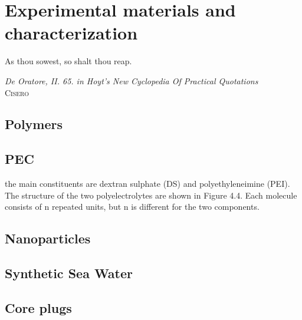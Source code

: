 \chapter{Experimental materials and characterization}
\vspace*{\fill}
\epigraph{As thou sowest, so shalt thou reap.}%
{\textit{De Oratore, II. 65. in Hoyt's New Cyclopedia Of Practical Quotations}\\ \textsc{Cisero}}
\clearpage{\thispagestyle{empty}\cleardoublepage}
\section{Polymers}

\section{PEC}
the main constituents are dextran sulphate (DS) and polyethyleneimine (PEI). The structure of the two polyelectrolytes are shown in Figure 4.4. Each molecule consists of n repeated units, but n is different for the two components.

\section{Nanoparticles}


\section{Synthetic Sea Water}


\section{Core plugs}